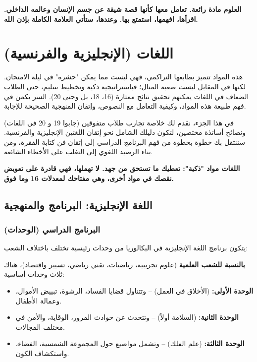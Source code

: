 \documentclass[12pt,a4paper]{book}
\newcommand{\importantAr}[1]{%
	\begin{important}
		\bfseries #1
	\end{important}
}
\begin{document}
	\importantAr{العلوم مادة رائعة. تعامل معها كأنها قصة شيقة عن جسم الإنسان وعالمه الداخلي. اقرأها، افهمها، استمتع بها. وعندها، ستأتي العلامة الكاملة بإذن الله.}
	
	
	
	\section{اللغات (الإنجليزية والفرنسية)}
	
	
	هذه المواد تتميز بطابعها التراكمي، فهي ليست مما يمكن "حشره" في ليلة الامتحان. لكنها في المقابل ليست صعبة المنال؛ فباستراتيجية ذكية وتخطيط سليم، حتى الطلاب الضعاف في اللغات يمكنهم تحقيق نتائج ممتازة (16، 18، بل وحتى 20). السر يكمن في فهم طبيعة هذه المواد، وكيفية التعامل مع النصوص، وإتقان المنهجية الصحيحة للإجابة.
	
	في هذا الجزء، نقدم لك خلاصة تجارب طلاب متفوقين (جابوا 19 و 20 في اللغات) ونصائح أساتذة مختصين، لتكون دليلك الشامل نحو إتقان اللغتين الإنجليزية والفرنسية. سننتقل بك خطوة بخطوة من فهم البرنامج الدراسي إلى إتقان فن كتابة الفقرة، ومن بناء الرصيد اللغوي إلى التغلب على الأخطاء الشائعة.
	
	\importantAr{اللغات مواد "ذكية": تعطيك ما تستحق من جهد. لا تهملها، فهي قادرة على تعويض نقصك في مواد أخرى، وهي مفتاحك لمعدلات 16 وما فوق.}
	
	
	\subsection{اللغة الإنجليزية: البرنامج والمنهجية}
	
	\subsubsection{البرنامج الدراسي (الوحدات)}
	
	يتكون برنامج اللغة الإنجليزية في البكالوريا من وحدات رئيسية تختلف باختلاف الشعب:
	
	\textbf{بالنسبة للشعب العلمية} (علوم تجريبية، رياضيات، تقني رياضي، تسيير واقتصاد)، هناك ثلاث وحدات أساسية:
	\begin{itemize}
		\item \textbf{الوحدة الأولى:}  (الأخلاق في العمل) – وتتناول قضايا الفساد، الرشوة، تبييض الأموال، وعمالة الأطفال.
		\item \textbf{الوحدة الثانية:}  (السلامة أولاً) – وتتحدث عن حوادث المرور، الوقاية، والأمن في مختلف المجالات.
		\item \textbf{الوحدة الثالثة:}  (علم الفلك) – وتشمل مواضيع حول المجموعة الشمسية، الفضاء، واستكشاف الكون.
	\end{itemize}
	
\end{document}
